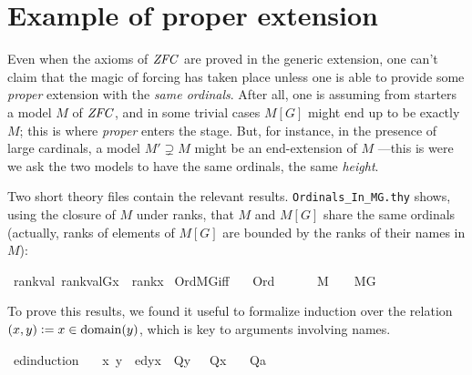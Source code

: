 \section{Example of proper extension}

Even when the axioms of $\mathit{ZFC}$ are proved in the generic extension,
one can't claim that the magic of forcing has taken place unless one
is able to provide some \emph{proper} extension with the \emph{same
ordinals}. After all, one is assuming from starters a model $M$ of $\mathit{ZFC}$,
and in some trivial cases $M[G]$ might end up to be exactly $M$; this
is where \emph{proper} enters the stage. But, for instance, in the
presence of large cardinals, a model $M'\supsetneq M$ might be an
end-extension of $M$ ---this is were we ask the two models to have the
same ordinals, the same \emph{height}. 

Two short theory files contain the relevant
results. \texttt{Ordinals\_In\_MG.thy} shows, using the closure of $M$
under ranks, that $M$ and $M[G]$ share the same ordinals (actually,
ranks of elements of $M[G]$ are bounded by the ranks of their names in
$M$):
\begin{isabelle}
\isamarkupfalse%
\ rank{\isacharunderscore}val{\isacharcolon}\ {\isachardoublequoteopen}rank{\isacharparenleft}val{\isacharparenleft}G{\isacharcomma}x{\isacharparenright}{\isacharparenright}\ {\isasymle}\ rank{\isacharparenleft}x{\isacharparenright}{\isachardoublequoteclose}\isanewline
{}\isamarkupfalse%
\ Ord{\isacharunderscore}MG{\isacharunderscore}iff{\isacharcolon}\isanewline
\ \ \ {\isachardoublequoteopen}Ord{\isacharparenleft}{\isasymalpha}{\isacharparenright}{\isachardoublequoteclose}\ \isanewline
\ \ \ {\isachardoublequoteopen}{\isasymalpha}\ {\isasymin}\ M\ {\isasymlongleftrightarrow}\ {\isasymalpha}\ {\isasymin}\ M{\isacharbrackleft}G{\isacharbrackright}{\isachardoublequoteclose}
\end{isabelle}

To prove this results, we found it useful to formalize induction over
the relation $(x,y) \mathrel{\mathop:}= x\in\operatorname{domain}(y)$, which is key
to arguments involving names.
\begin{isabelle}
\isamarkupfalse%
\ ed{\isacharunderscore}induction{\isacharcolon}\isanewline
\ \ \ {\isachardoublequoteopen}{\isasymAnd}x{\isachardot}\ {\isasymlbrakk}{\isasymAnd}y{\isachardot}\ \ ed{\isacharparenleft}y{\isacharcomma}x{\isacharparenright}\ {\isasymLongrightarrow}\ Q{\isacharparenleft}y{\isacharparenright}\ {\isasymrbrakk}\ {\isasymLongrightarrow}\ Q{\isacharparenleft}x{\isacharparenright}{\isachardoublequoteclose}\isanewline
\ \ \ {\isachardoublequoteopen}Q{\isacharparenleft}a{\isacharparenright}{\isachardoublequoteclose}
\end{isabelle}

